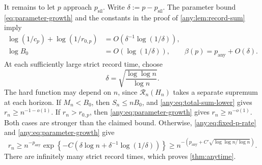 \documentclass[11pt,letterpaper]{article}
\theoremstyle{definition}
\newcommand{\psil}{p_{\mathrm{sil}}}
\newcommand{\pany}{p_{\mathrm{any}}}
\begin{document}
It remains to let $p$ approach $\psil$.
Write $\delta:=p-\psil$.
The parameter bound \eqref{eq:parameter-growth} and the constants in the proof of \cref{any:lem:record-sum} imply
\begin{equation}
\begin{aligned}
    \log(1/c_p)+\log(1/r_{0,p}) &=O\!\left(\delta^{-1}\log(1/\delta)\right),\\
    \log B_0&=O\!\left(\log(1/\delta)\right), \qquad \beta(p)=\pany+O(\delta).
\end{aligned}
\label{any:eq:parameter-growth}
\end{equation}
At each sufficiently large strict record time, choose
\[
    \delta=\sqrt{\frac{\log\log n}{\log n}}.
\]
The hard function may depend on $n$, since $\mathcal R_n(H_n)$ takes a separate supremum at each horizon.
If $M_n<B_0$, then $S_n\le nB_0$, and \eqref{any:eq:total-sum-lower} gives $r_n\ge n^{-1-o(1)}$.
If $r_n>r_{0,p}$, then \eqref{any:eq:parameter-growth} gives $r_n\ge n^{-o(1)}$.
Both cases are stronger than the claimed bound.
Otherwise, \eqref{any:eq:fixed-p-rate} and \eqref{any:eq:parameter-growth} give
\[
    r_n\ge n^{-\pany} \exp\!\left\{-C\left(\delta\log n+\delta^{-1}\log(1/\delta)\right)\right\} \ge n^{-\left(\pany+C'\sqrt{\log\log n/\log n}\right)}.
\]
There are infinitely many strict record times, which proves \cref{thm:anytime}.
\end{document}
